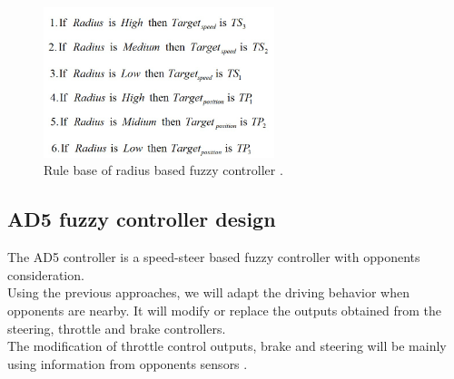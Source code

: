 \documentclass{llncs}
\begin{document}
\begin{figure}[h!]
	
	\centering
	\includegraphics[width=0.6\textwidth]{fig/regle.PNG}
	\begin{minipage}{10cm}
		\centering
		\caption{\footnotesize Rule base of radius based fuzzy  controller .}
		\label{fig40}
	\end{minipage} 
	
	
\end{figure}

\subsection{AD5 fuzzy controller design}


The AD5 controller is a speed-steer based fuzzy controller with opponents consideration.\\

Using the previous approaches, we will adapt the driving behavior when opponents are nearby. It will modify or replace the outputs obtained from the steering, throttle and brake controllers.
\\

The modification of throttle control outputs, brake and steering will be mainly using information from opponents sensors .
\end{document}
